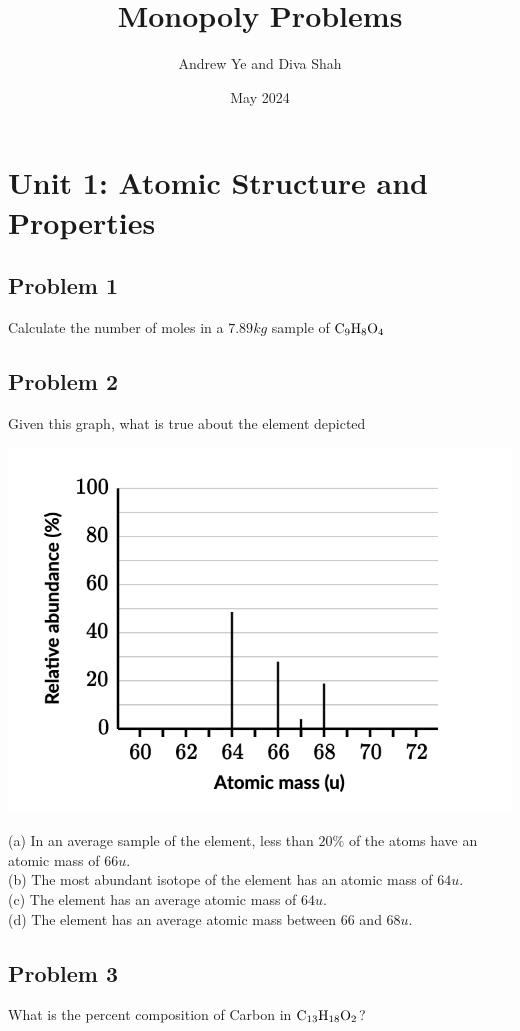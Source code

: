 \documentclass{article}
\title{Monopoly Problems}
\author{Andrew Ye and Diva Shah}
\date{May 2024}
\begin{document}
\maketitle
\newpage
\tableofcontents
\newpage

\section{Unit 1: Atomic Structure and Properties}
\subsection*{Problem 1}
Calculate the number of moles in a \(7.89 kg\) sample of \(\ce{C_9H_8O_4}\) 
\subsection*{Problem 2}
Given this graph, what is true about the element depicted
\begin{center}
    \includegraphics[scale = 0.5]{photos/photo1.png}
\end{center}
(a) In an average sample of the element, less than \(20\%\) of the atoms have an atomic mass of \(66u\). \\
(b) The most abundant isotope of the element has an atomic mass of \(64u\). \\
(c) The element has an average atomic mass of \(64u\). \\
(d) The element has an average atomic mass between \(66\) and \(68u\). \\
\subsection*{Problem 3}
What is the percent composition of Carbon in \(\ce{C_{13}H_{18}O_2}\)?
\end{document}
